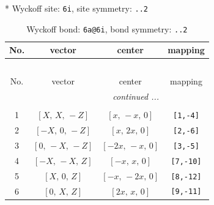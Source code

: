\documentclass[fleqn,8pt]{jsarticle}
\begin{document}
* Wyckoff site: {\tt 6i}, site symmetry: {\tt ..2}
\renewcommand{\arraystretch}{1.2}
\begin{longtable}{cccc}
\caption{Wyckoff bond: {\tt 6a@6i}, bond symmetry: {\tt ..2}}
 \\
 \hline \hline
No. & vector & center & mapping \\ \hline \endfirsthead

\multicolumn{3}{l}{\tablename\ \thetable{}} \\
 \hline \hline
No. & vector & center & mapping \\ \hline \endhead

 \hline \hline
\multicolumn{3}{r}{\footnotesize\it continued ...} \\ \endfoot

 \hline \hline
\multicolumn{3}{r}{} \\ \endlastfoot

1 & $\left[ X,\, X,\, - Z \right]$ & $\left[ x,\, - x,\, 0 \right]$ & {\tt [1,-4]} \\ \hline
2 & $\left[ - X,\, 0,\, - Z \right]$ & $\left[ x,\, 2 x,\, 0 \right]$ & {\tt [2,-6]} \\ \hline
3 & $\left[ 0,\, - X,\, - Z \right]$ & $\left[ - 2 x,\, - x,\, 0 \right]$ & {\tt [3,-5]} \\ \hline
4 & $\left[ - X,\, - X,\, Z \right]$ & $\left[ - x,\, x,\, 0 \right]$ & {\tt [7,-10]} \\ \hline
5 & $\left[ X,\, 0,\, Z \right]$ & $\left[ - x,\, - 2 x,\, 0 \right]$ & {\tt [8,-12]} \\ \hline
6 & $\left[ 0,\, X,\, Z \right]$ & $\left[ 2 x,\, x,\, 0 \right]$ & {\tt [9,-11]} \\
\end{longtable}
\renewcommand{\arraystretch}{1.2}
\end{document}

